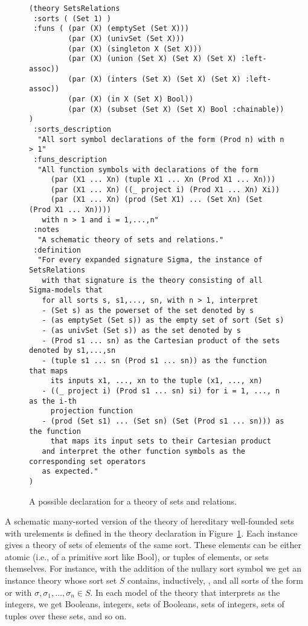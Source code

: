 \begin{figure}
\small
{\color{NavyBlue}
\begin{verbatim}
(theory SetsRelations
 :sorts ( (Set 1) )
 :funs ( (par (X) (emptySet (Set X)))
         (par (X) (univSet (Set X)))
         (par (X) (singleton X (Set X)))
         (par (X) (union (Set X) (Set X) (Set X) :left-assoc))
         (par (X) (inters (Set X) (Set X) (Set X) :left-assoc))
         (par (X) (in X (Set X) Bool))
         (par (X) (subset (Set X) (Set X) Bool :chainable)) )
 :sorts_description
  "All sort symbol declarations of the form (Prod n) with n > 1"
 :funs_description
  "All function symbols with declarations of the form
     (par (X1 ... Xn) (tuple X1 ... Xn (Prod X1 ... Xn)))  
     (par (X1 ... Xn) ((_ project i) (Prod X1 ... Xn) Xi))  
     (par (X1 ... Xn) (prod (Set X1) ... (Set Xn) (Set (Prod X1 ... Xn))))  
   with n > 1 and i = 1,...,n"
 :notes
  "A schematic theory of sets and relations."
 :definition
  "For every expanded signature Sigma, the instance of SetsRelations 
   with that signature is the theory consisting of all Sigma-models that 
   for all sorts s, s1,..., sn, with n > 1, interpret
   - (Set s) as the powerset of the set denoted by s
   - (as emptySet (Set s)) as the empty set of sort (Set s)
   - (as univSet (Set s)) as the set denoted by s
   - (Prod s1 ... sn) as the Cartesian product of the sets denoted by s1,...,sn
   - (tuple s1 ... sn (Prod s1 ... sn)) as the function that maps
     its inputs x1, ..., xn to the tuple (x1, ..., xn) 
   - ((_ project i) (Prod s1 ... sn) si) for i = 1, ..., n as the i-th
     projection function
   - (prod (Set s1) ... (Set sn) (Set (Prod s1 ... sn))) as the function
     that maps its input sets to their Cartesian product
   and interpret the other function symbols as the corresponding set operators
   as expected."
)
\end{verbatim}
}%
\caption{A possible declaration for a theory of sets and relations.}
\label{fig:SetsRelations}
\end{figure}

A schematic many-sorted version of the theory of hereditary well-founded 
sets with urelements is defined in the theory declaration  
in Figure~\ref{fig:SetsRelations}.
Each instance gives a theory of sets of elements of the same sort.
These elements can be either atomic (i.e., of a primitive sort like Bool), 
or tuples of elements, or sets themselves.
For instance, with the addition of the nullary sort symbol 
we get an instance theory whose sort set $S$ contains, inductively,
,  and all sorts of the form
 or 
with $\sigma, \sigma_1, \ldots, \sigma_n \in S$.
In each model of the theory that interprets  as the integers,
we get Booleans, integers, sets of Booleans, sets of integers, 
sets of tuples over these sets, and so on.

